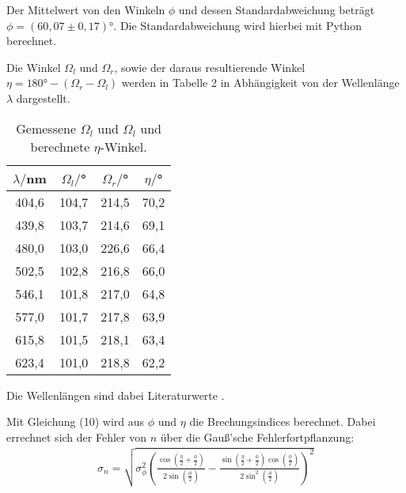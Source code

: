 Der Mittelwert von den Winkeln $\phi$ und dessen Standardabweichung beträgt $\phi = (60,07 \pm 0,17)°$. Die Standardabweichung wird hierbei
mit Python berechnet.


Die Winkel $\Omega_l$ und $\Omega_r$, sowie der daraus resultierende Winkel $\eta = 180° - (\Omega_r-\Omega_l)$ werden in Tabelle 2 in Abhängigkeit von der
Wellenlänge $\lambda$ dargestellt.



\begin{table}[H]
  \centering
  \caption{Gemessene $\Omega_l$ und $\Omega_l$ und berechnete $\eta$-Winkel.}
  \label{tab:spannung1}
  \begin{tabular}{c c c c}
    \toprule
  $\lambda/$nm &  $\Omega_l/$° & $\Omega_r/$° & $\eta/$° \\
    \midrule
    404,6  & 104,7  &  214,5 & 70,2     \\
    439,8  & 103,7  &  214,6 & 69,1     \\
    480,0  & 103,0  &  226,6 & 66,4      \\
    502,5  & 102,8  &  216,8 & 66,0      \\
    546,1  & 101,8  &  217,0 & 64,8      \\
    577,0  & 101,7  &  217,8 & 63,9      \\
    615,8  & 101,5  &  218,1 & 63,4      \\
    623,4  & 101,0  &  218,8 & 62,2      \\
    \bottomrule
  \end{tabular}
\end{table}

Die Wellenlängen sind dabei Literaturwerte \cite{sample2}.

Mit Gleichung (10) wird aus $\phi$ und $\eta$ die Brechungsindices berechnet. Dabei errechnet sich der Fehler von $n$ über die Gauß'sche Fehlerfortpflanzung:
\begin{align*}
  \sigma_n = \sqrt{
   \sigma_{\phi}^{2} \left(\frac{\cos{\left (\frac{\eta}{2} + \frac{\phi}{2} \right )}}{2 \sin{\left (\frac{\phi}{2} \right )}} - \frac{\sin{\left (\frac{\eta}{2}
  + \frac{\phi}{2} \right )} \cos{\left (\frac{\phi}{2} \right )}}{2 \sin^{2}{\left (\frac{\phi}{2} \right )}}\right)^{2}}
\end{align*}



